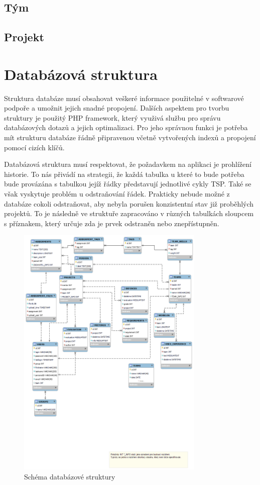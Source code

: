 \documentclass[czech,BP]{thesiskiv}
\begin{document}
		\subsection{Tým}
		\subsection{Projekt}
			
	\section{Databázová struktura}
		\par Struktura databáze musí obsahovat veškeré informace použitelné v softwarové podpoře a umožnit jejich snadné propojení. Dalších aspektem pro tvorbu struktury je použitý PHP framework, který využivá službu pro správu databázových dotazů a jejich optimalizaci. Pro jeho správnou funkci je potřeba mít strukturu databáze řádně připravenou včetně vytvořených indexů a propojení pomocí cizích klíčů.
		\par Databázová struktura musí respektovat, že požadavkem na aplikaci je prohlížení historie. To nás přivádí na strategii, že každá tabulka u které to bude potřeba bude provázána s tabulkou jejíž řádky představují jednotlivé cykly TSP. Také se však vyskytuje problém u odstraňování řádek. Prakticky nebude možné z databáze cokoli odstraňovat, aby nebyla porušen konzistentní stav již proběhlých projektů. To je následně ve struktuře zapracováno v různých tabulkách sloupcem s příznakem, který určuje zda je prvek odstraněn nebo znepřístupněn.
		
		\begin{figure}[H]
			\centering
			\includegraphics[width=0.8\textwidth]{img/database/database_model}
			\caption{Schéma databázové struktury}
		\end{figure}
\end{document}
